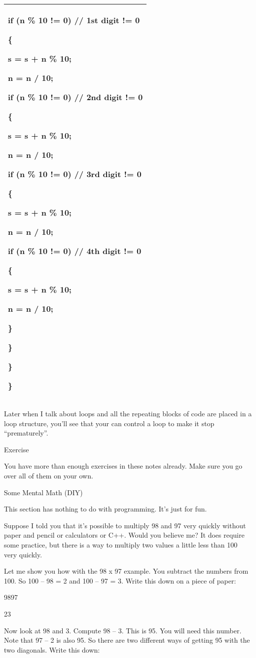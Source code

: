 \documentclass[
]{article}
\begin{document}
\begin{longtable}[]{@{}l@{}}
\toprule
\endhead
\begin{minipage}[t]{0.97\columnwidth}\raggedright
if (n \% 10 != 0) // 1st digit != 0

\{

s = s + n \% 10;

n = n / 10;

if (n \% 10 != 0) // 2nd digit != 0

\{

s = s + n \% 10;

n = n / 10;

if (n \% 10 != 0) // 3rd digit != 0

\{

s = s + n \% 10;

n = n / 10;

if (n \% 10 != 0) // 4th digit != 0

\{

s = s + n \% 10;

n = n / 10;

\}

\}

\}

\}\strut
\end{minipage}\tabularnewline
\bottomrule
\end{longtable}

Later when I talk about loops and all the repeating blocks of code are
placed in a loop structure, you'll see that your can control a loop to
make it stop ``prematurely''.

Exercise

You have more than enough exercises in these notes already. Make sure
you go over all of them on your own.

Some Mental Math (DIY)

This section has nothing to do with programming. It's just for fun.

Suppose I told you that it's possible to multiply 98 and 97 very quickly
without paper and pencil or calculators or C++. Would you believe me? It
does require some practice, but there is a way to multiply two values a
little less than 100 very quickly.

Let me show you how with the 98 x 97 example. You subtract the numbers
from 100. So 100 -- 98 = 2 and 100 -- 97 = 3. Write this down on a piece
of paper:

9897

23

Now look at 98 and 3. Compute 98 -- 3. This is 95. You will need this
number. Note that 97 -- 2 is also 95. So there are two different ways of
getting 95 with the two diagonals. Write this down:
\end{document}
